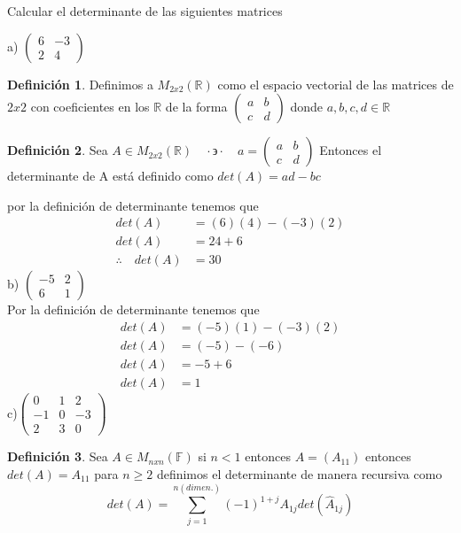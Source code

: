 \documentclass[letterpaper]{article}
\newcommand{\F}{\mathds{F}}
\newcommand{\tq}{ \quad \cdot  \backepsilon \cdot \quad }
\newcommand{\R}{\mathds{R}}
\renewcommand{\*}{\cdot}
\theoremstyle{definition}
\newtheorem{definition}{Definición}
\begin{document}
	\begin{ejercicio}{14}
		Calcular el determinante de las siguientes matrices 
	\end{ejercicio}
	\noindent a) $\begin{pmatrix} 6 & -3 \\ 2 & 4 \end{pmatrix}$\\
	\begin{definition}
		Definimos a $ M_{2x2}(\R) $ como el espacio vectorial de las matrices de $ 2x2 $ con coeficientes en los $ \R $ de la forma $ 		\begin{pmatrix}
		a& b\\
		c& d
		\end{pmatrix} $ donde $ a,b,c,d \in \R $
	\end{definition}
	\begin{definition}
		Sea $ A \in M_{2x2}(\R) \tq a = \begin{pmatrix}
		a& b\\
		c& d
		\end{pmatrix}$ Entonces el determinante de A está definido como $  det(A) = ad -bc $
	\end{definition}
	por la definición de determinante tenemos que
	\begin{align*}
		det(A) &= (6)(4) - (-3)(2)\\
		det(A) &= 24 +6\\
		\therefore \quad det(A) &= 30
	\end{align*}
	b) $\begin{pmatrix} -5 & 2 \\ 6 & 1 \end{pmatrix}$ \\
	Por la definición de determinante tenemos que 
	\begin{align*}
		det(A) &= (-5)(1)-(-3)(2)\\
		det(A) &= (-5)-(-6)\\
		det(A) &= -5+6\\
		det(A) &= 1
	\end{align*}
	c)$\begin{pmatrix} 0 & 1 & 2 \\ -1 & 0 & -3 \\ 2 & 3 & 0 \end{pmatrix}$\\
	\begin{definition}
		Sea $ A \in M_{nxn}(\F) $  si $ n < 1 $ entonces $ A = (A_{11}) $ entonces $ det(A) = A_{11} $ para $ n\geq 2 $ definimos el determinante de manera recursiva como
		\[ det(A) = \sum_{j = 1}^{n (dimen.)} (-1)^{1 + j} A_{1j}det(\hat{A}_{1j}) \]
	\end{definition}
\end{document}
